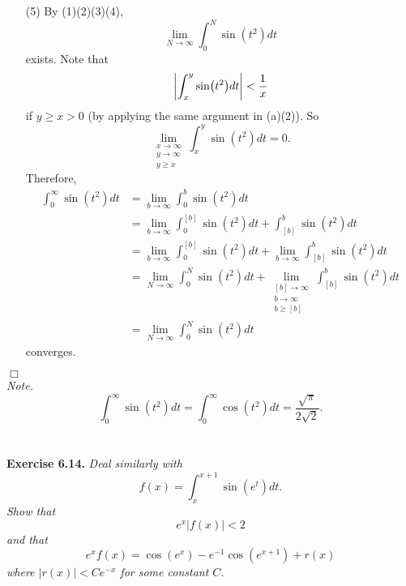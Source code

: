 \documentclass{article}
\begin{document}
\begin{enumerate}
  \item[(5)]
  By (1)(2)(3)(4),
  \[
    \lim_{N \to \infty} \int_{0}^{N} \sin(t^2) dt
  \]
  exists.
  Note that
  \[
    \abs{ \int_{x}^{y} \sin(t^2) dt } < \frac{1}{x}
  \]
  if $y \geq x > 0$ (by applying the same argument in (a)(2)).
  So
  \[
    \lim_{\substack{x \to \infty \\ y \to \infty \\ y \geq x}}
      \int_{x}^{y} \sin(t^2) dt = 0.
  \]
  Therefore,
  \begin{align*}
    \int_{0}^{\infty} \sin(t^2) dt
    &= \lim_{b \to \infty} \int_{0}^{b} \sin(t^2) dt \\
    &= \lim_{b \to \infty} \int_{0}^{[b]} \sin(t^2) dt + \int_{[b]}^{b} \sin(t^2) dt \\
    &= \lim_{b \to \infty} \int_{0}^{[b]} \sin(t^2) dt
      + \lim_{b \to \infty} \int_{[b]}^{b} \sin(t^2) dt \\
    &= \lim_{N \to \infty} \int_{0}^{N} \sin(t^2) dt
      + \lim_{\substack{[b] \to \infty \\ b \to \infty \\ b \geq [b]}}
        \int_{[b]}^{b} \sin(t^2) dt \\
    &= \lim_{N \to \infty} \int_{0}^{N} \sin(t^2) dt
  \end{align*}
  converges.
\end{enumerate}
$\Box$ \\



\emph{Note.}
\[
  \int_{0}^{\infty} \sin(t^2)dt
  = \int_{0}^{\infty} \cos(t^2)dt
  = \frac{\sqrt{\pi}}{2\sqrt{2}}.
\] \\\\






\textbf{Exercise 6.14.}
\emph{Deal similarly with
\[
  f(x) = \int_{x}^{x+1} \sin(e^t) dt.
\]
Show that
\[
  e^x|f(x)| < 2
\]
and that
\[
  e^x f(x) = \cos(e^x) - e^{-1} \cos(e^{x+1}) + r(x)
\]
where $|r(x)| < Ce^{-x}$ for some constant $C$.} \\
\end{document}
